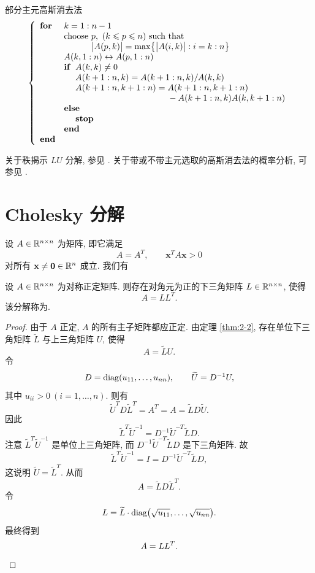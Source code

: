 \begin{algorithm}{部分主元高斯消去法}
  \label{alg:2-3}
\[
  \left\{
  \begin{array}{ll}
    \textbf{for} & k=1:n-1\\
    & \text{choose } p,\ (k\leqslant p\leqslant n)\ \text{such that}\\
    & \hphantom{\text{choose }}\bigl|A(p,k)\bigr|=\max\bigl\{\bigl|A(i,k)\bigr|:i=k:n\bigr\}\\
    & A(k,1:n)\leftrightarrow A(p,1:n)\\
    & \textbf{if}\ \ A(k,k)\neq0\\
    & \hphantom{\textbf{if}\ \ }A(k+1:n,k)=A(k+1:n,k)/A(k,k)\\
    & \hphantom{\textbf{if}\ \ }A(k+1:n,k+1:n)=A(k+1:n,k+1:n)\\
    & \hphantom{\textbf{if}\ \ A(k+1:n,k+1:n)={}}-A(k+1:n,k)A(k,k+1:n)\\
    & \textbf{else}\\
    & \hphantom{\textbf{if}\ \ }\textbf{stop}\\
    & \textbf{end}\\
    \textbf{end}
  \end{array}
  \right.
\]
\end{algorithm}

关于秩揭示 $LU$ 分解, 参见 \cite{src:40}. 关于带或不带主元选取的高斯消去法的概率分析, 可参见 \cite{src:34,src:81,src:99}.

\section{Cholesky 分解}

设 $A\in\mathbb{R}^{n\times n}$ 为矩阵, 即它满足
\[
  A=A^T,\qquad \mathbf{x}^TA\mathbf{x}>0
\]
对所有 $\mathbf{x}\neq\mathbf{0}\in\mathbb{R}^n$ 成立. 我们有

\begin{theorem}
\label{thm:2-4}
设 $A\in\mathbb{R}^{n\times n}$ 为对称正定矩阵. 则存在对角元为正的下三角矩阵 $L\in\mathbb{R}^{n\times n}$, 使得
\[
  A=LL^T.
\]
该分解称为.
\end{theorem}

\begin{proof}
由于 $A$ 正定, $A$ 的所有主子矩阵都应正定. 由定理 \ref{thm:2-2}, 存在单位下三角矩阵 $\widetilde{L}$ 与上三角矩阵 $U$, 使得
\[
  A=\widetilde{L}U.
\]
令
\[
  D=\operatorname{diag}(u_{11},\ldots,u_{nn}),\qquad \widetilde{U}=D^{-1}U,
\]
其中 $u_{ii}>0\ (i=1,\ldots,n)$. 则有
\[
  \widetilde{U}^TD\widetilde{L}^T=A^T=A=\widetilde{L}D\widetilde{U}.
\]
因此
\[
  \widetilde{L}^T\widetilde{U}^{-1}=D^{-1}\widetilde{U}^{-T}\widetilde{L}D.
\]
注意 $\widetilde{L}^T\widetilde{U}^{-1}$ 是单位上三角矩阵, 而 $D^{-1}\widetilde{U}^{-T}\widetilde{L}D$ 是下三角矩阵. 故
\[
  \widetilde{L}^T\widetilde{U}^{-1}=I=D^{-1}\widetilde{U}^{-T}\widetilde{L}D,
\]
这说明 $\widetilde{U}=\widetilde{L}^T$. 从而
\[
  A=\widetilde{L}D\widetilde{L}^T.
\]
令
\[
  L=\widetilde{L}\cdot\operatorname{diag}\bigl(\sqrt{u_{11}},\ldots,\sqrt{u_{nn}}\bigr).
\]
最终得到
\[
  A=LL^T. \qedhere
\]
\end{proof}

